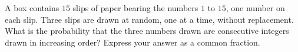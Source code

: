 A box contains $15$ slips of paper bearing the numbers $1$ to $15$, one number on each slip. Three slips are drawn at random, one at a time, without replacement. What is the probability that the three numbers drawn are consecutive integers drawn in increasing order? Express your answer as a common fraction.

